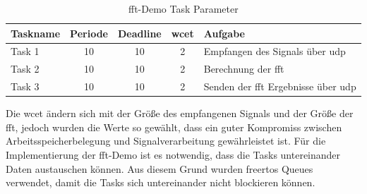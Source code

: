 \documentclass[../EDF Master Thesis.tex]{subfiles}
\begin{document}
            \begin{table}[ht!]
                \centering
                \begin{tabular}{l|c|c|c|l}
                    Taskname & Periode & Deadline & \ac{wcet} & Aufgabe \\
                    \hline
                    Task 1 & 10 & 10 & 2 & Empfangen des Signals über \ac{udp}\\
                    Task 2 & 10 & 10 & 2 & Berechnung der \ac{fft}\\
                    Task 3 & 10 & 10 & 2 & Senden der \ac{fft} Ergebnisse über \ac{udp}
                \end{tabular}
                \caption{\ac{fft}-Demo Task Parameter}
                \label{table:fft_demo_task_parameter}
            \end{table}

            Die \ac{wcet} ändern sich mit der Größe des empfangenen Signals und der Größe der \ac{fft}, jedoch wurden die Werte so gewählt, dass ein guter Kompromiss zwischen Arbeitsspeicherbelegung und Signalverarbeitung gewährleistet ist.
            Für die Implementierung der \ac{fft}-Demo ist es notwendig, dass die Tasks untereinander Daten austauschen können.
            Aus diesem Grund wurden \ac{freertos} Queues verwendet, damit die Tasks sich untereinander nicht blockieren können.
\end{document}
